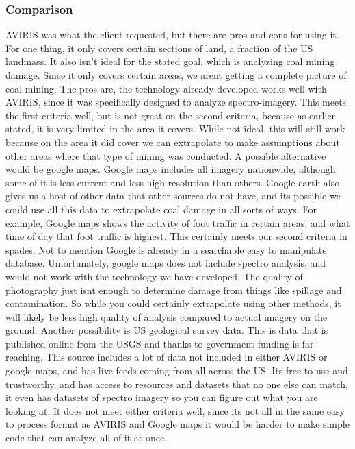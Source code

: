 \documentclass[10pt,draftclsnofoot,onecolumn,journal,compsoc]{IEEEtran}
\begin{document}
\subsubsection{Comparison}
AVIRIS was what the client requested, but there are pros and cons for using it. For one thing, it only covers
certain sections of land, a fraction of the US landmass. It also isn't ideal for the stated goal, which is analyzing
coal mining damage. Since it only covers certain areas, we arent getting a complete picture of coal mining. The
pros are, the technology already developed works well with AVIRIS, since it was specifically designed to analyze
spectro-imagery. This meets the first criteria well, but is not great on the second criteria, because as earlier stated,
it is very limited in the area it covers. While not ideal, this will still work because on the area it did cover we
can extrapolate to make assumptions about other areas where that type of mining was conducted.\cite{3}
A possible alternative would be google maps. Google maps includes all imagery nationwide, although some
of it is less current and less high resolution than others. Google earth also gives us a host of other data that other
sources do not have, and its possible we could use all this data to extrapolate coal damage in all sorts of ways.
For example, Google maps shows the activity of foot traffic in certain areas, and what time of day that foot traffic
is highest. This certainly meets our second criteria in spades. Not to mention Google is already in a searchable
easy to manipulate database. Unfortunately, google maps does not include spectro analysis, and would not work
with the technology we have developed. The quality of photography just isnt enough to determine damage from
things like spillage and contamination. So while you could certainly extrapolate using other methods, it will
likely be less high quality of analysis compared to actual imagery on the ground.
Another possibility is US geological survey data. This is data that is published online from the USGS and
thanks to government funding is far reaching. This source includes a lot of data not included in either AVIRIS or
google maps, and has live feeds coming from all across the US. Its free to use and trustworthy, and has access to
resources and datasets that no one else can match, it even has datasets of spectro imagery so you can figure out
what you are looking at. It does not meet either criteria well, since its not all in the same easy to process format
as AVIRIS and Google maps it would be harder to make simple code that can analyze all of it at once. \cite{2}
\end{document}
